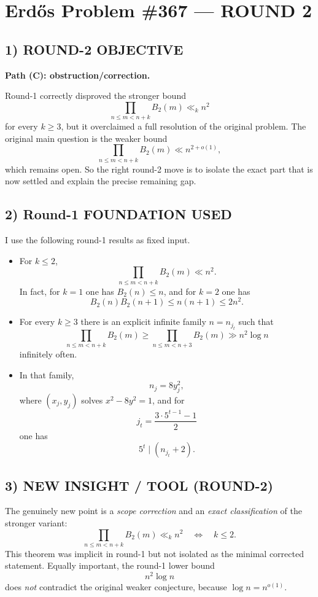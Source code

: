 \section*{Erd\H{o}s Problem \#367 --- ROUND 2}

\subsection*{1) ROUND-2 OBJECTIVE}
\textbf{Path (C): obstruction/correction.}

Round-1 correctly disproved the stronger bound
\[
\prod_{n\le m<n+k} B_2(m) \ll_k n^2
\]
for every $k\ge 3$, but it overclaimed a full resolution of the original problem. The original main question is the weaker bound
\[
\prod_{n\le m<n+k} B_2(m) \ll n^{2+o(1)},
\]
which remains open. So the right round-2 move is to isolate the exact part that is now settled and explain the precise remaining gap.

\subsection*{2) Round-1 FOUNDATION USED}
I use the following round-1 results as fixed input.
\begin{itemize}
\item For $k\le 2$,
\[
\prod_{n\le m<n+k} B_2(m) \ll n^2.
\]
In fact, for $k=1$ one has $B_2(n)\le n$, and for $k=2$ one has
\[
B_2(n)B_2(n+1)\le n(n+1)\le 2n^2.
\]
\item For every $k\ge 3$ there is an explicit infinite family $n=n_{j_t}$ such that
\[
\prod_{n\le m<n+k} B_2(m) \ge \prod_{n\le m<n+3} B_2(m) \gg n^2\log n
\]
infinitely often.
\item In that family,
\[
n_j=8y_j^2,
\]
where $(x_j,y_j)$ solves $x^2-8y^2=1$, and for
\[
j_t=\frac{3\cdot 5^{t-1}-1}{2}
\]
one has
\[
5^t\mid (n_{j_t}+2).
\]
\end{itemize}

\subsection*{3) NEW INSIGHT / TOOL (ROUND-2)}
The genuinely new point is a \emph{scope correction} and an \emph{exact classification} of the stronger variant:
\[
\prod_{n\le m<n+k} B_2(m) \ll_k n^2
\quad\Longleftrightarrow\quad
k\le 2.
\]
This theorem was implicit in round-1 but not isolated as the minimal corrected statement. Equally important, the round-1 lower bound
\[
n^2\log n
\]
does \emph{not} contradict the original weaker conjecture, because $\log n=n^{o(1)}$.

